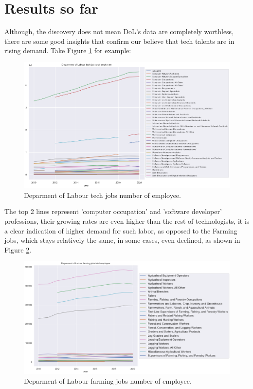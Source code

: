 \section{Results so far } %
Although, the discovery does not mean DoL's data are completely worthless, there are some good insights that confirm our believe that tech talents are in rising demand. Take Figure \ref{dolnumofemployee} for example:
\begin{figure}[h]
	\begin{center}
		\includegraphics[width=\linewidth]{./photos/totaltech.png}
	\end{center}
	\caption{Deparment of Labour tech jobs number of employee.}
	\label{dolnumofemployee}
\end{figure}
The top 2 lines represent 'computer occupation' and 'software developer' professions, their growing rates are even higher than the rest of  technologists, it is a clear indication of higher demand for such labor, as opposed to the Farming jobs, which stays relatively the same, in some cases, even declined, as shown in Figure \ref{dolfarming}.
\begin{figure}[h]
	\begin{center}
		\includegraphics[width=\linewidth]{./photos/dolfarming.png}
	\end{center}
	\caption{Deparment of Labour farming jobs number of employee.}
	\label{dolfarming}
\end{figure}
